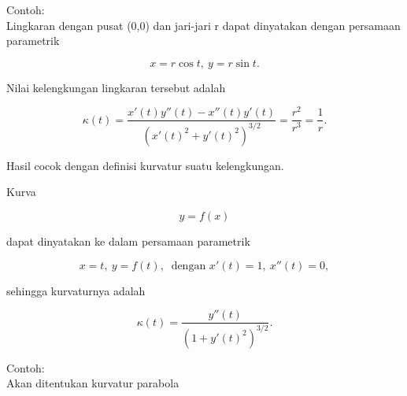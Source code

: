 \documentclass[a4paper,10pt]{article}
\begin{document}
\begin{eulernotebook}
\begin{eulercomment}
\begin{eulercomment}
\begin{eulercomment}
\begin{eulercomment}
\begin{eulercomment}
Contoh:\\
Lingkaran dengan pusat (0,0) dan jari-jari r dapat dinyatakan dengan
persamaan parametrik

\end{eulercomment}
\begin{eulerformula}
\[
x=r\cos t,\ y=r\sin t.
\]
\end{eulerformula}
\begin{eulercomment}
Nilai kelengkungan lingkaran tersebut adalah

\end{eulercomment}
\begin{eulerformula}
\[
\kappa(t)=\frac{x'(t)y''(t)-x''(t)y'(t)}{\left(x'(t)^2+y'(t)^2\right)^{3/2}}=\frac{r^2}{r^3}=\frac 1 r.
\]
\end{eulerformula}
\begin{eulercomment}
Hasil cocok dengan definisi kurvatur suatu kelengkungan.
\end{eulercomment}
\begin{eulercomment}
Kurva

\end{eulercomment}
\begin{eulerformula}
\[
y=f(x)
\]
\end{eulerformula}
\begin{eulercomment}
dapat dinyatakan ke dalam persamaan parametrik

\end{eulercomment}
\begin{eulerformula}
\[
x=t,\ y=f(t),\ \text{ dengan } x'(t)=1,\ x''(t)=0,
\]
\end{eulerformula}
\begin{eulercomment}
sehingga kurvaturnya adalah

\end{eulercomment}
\begin{eulerformula}
\[
\kappa(t) = \frac{y''(t)}{\left(1+y'(t)^2\right)^{3/2}}.
\]
\end{eulerformula}
\begin{eulercomment}
Contoh:\\
Akan ditentukan kurvatur parabola


\end{eulercomment}
\end{eulercomment}
\end{eulercomment}
\end{eulercomment}
\end{eulercomment}
\end{eulernotebook}
\end{document}
